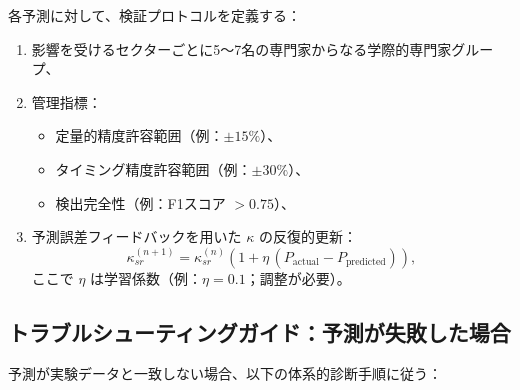 \documentclass[13pt,a4paper]{ltjsarticle}
\begin{document}
	各予測に対して、検証プロトコルを定義する：
	\begin{enumerate}[leftmargin=*]
		\item 影響を受けるセクターごとに5～7名の専門家からなる学際的専門家グループ、
		\item 管理指標：
		\begin{itemize}[leftmargin=*]
			\item 定量的精度許容範囲（例：$\pm 15\%$）、
			\item タイミング精度許容範囲（例：$\pm 30\%$）、
			\item 検出完全性（例：F1スコア $>0.75$）、
		\end{itemize}
		\item 予測誤差フィードバックを用いた $\kappa$ の反復的更新：
		\[
		\kappa_{sr}^{(n+1)}=\kappa_{sr}^{(n)}\left(1+\eta\,(P_{\mathrm{actual}}-P_{\mathrm{predicted}})\right),
		\]
		ここで $\eta$ は学習係数（例：$\eta=0.1$；調整が必要）。
	\end{enumerate}
	
	\subsection*{トラブルシューティングガイド：予測が失敗した場合}
	
	予測が実験データと一致しない場合、以下の体系的診断手順に従う：
	
\end{document}
